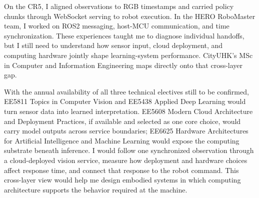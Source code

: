 On the CR5, I aligned observations to RGB timestamps and carried policy chunks through WebSocket serving to robot execution. In the HERO RoboMaster team, I worked on ROS2 messaging, host-MCU communication, and time synchronization. These experiences taught me to diagnose individual handoffs, but I still need to understand how sensor input, cloud deployment, and computing hardware jointly shape learning-system performance. CityUHK's MSc in Computer and Information Engineering maps directly onto that cross-layer gap.

With the annual availability of all three technical electives still to be confirmed, EE5811 Topics in Computer Vision and EE5438 Applied Deep Learning would turn sensor data into learned interpretation. EE5608 Modern Cloud Architecture and Deployment Practices, if available and selected as one core choice, would carry model outputs across service boundaries; EE6625 Hardware Architectures for Artificial Intelligence and Machine Learning would expose the computing substrate beneath inference. I would follow one synchronized observation through a cloud-deployed vision service, measure how deployment and hardware choices affect response time, and connect that response to the robot command. This cross-layer view would help me design embodied systems in which computing architecture supports the behavior required at the machine.
